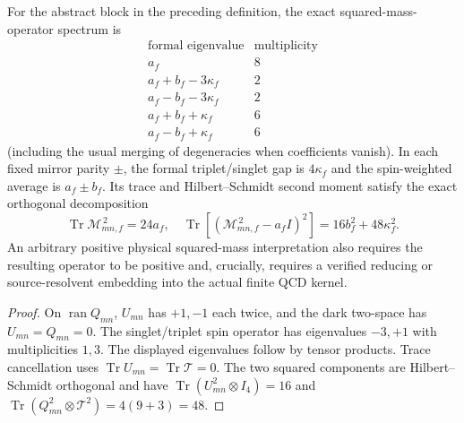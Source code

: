 \documentclass[12pt,a4paper]{article}
\begin{document}
\begin{theorem}
\label{p10:thm:v327-conditional-mirror-spin-spectrum}
For the abstract block in the preceding definition, the exact
squared-mass-operator spectrum is
\[
 \begin{array}{c|c}
 \text{formal eigenvalue}&\text{multiplicity}\\\hline
 a_f&8\\
 a_f+b_f-3\kappa_f&2\\
 a_f-b_f-3\kappa_f&2\\
 a_f+b_f+\kappa_f&6\\
 a_f-b_f+\kappa_f&6
 \end{array}
\]
(including the usual merging of degeneracies when coefficients vanish).
In each fixed mirror parity $\pm$, the formal triplet/singlet gap is
$4\kappa_f$ and the spin-weighted average is
$a_f\pm b_f$.
Its trace and Hilbert--Schmidt second moment satisfy the exact
orthogonal decomposition
\[
 \operatorname{Tr}\mathscr M_{mn,f}^{\,2}=24a_f,
 \quad \operatorname{Tr}\!\left[(\mathscr M_{mn,f}^{\,2}
 -a_fI)^2\right]=16b_f^2+48\kappa_f^2.
\]
An arbitrary positive physical squared-mass interpretation also
requires the resulting operator to be positive and, crucially,
requires a verified reducing or source-resolvent embedding into the
actual finite QCD kernel.
\end{theorem}
\begin{proof}
On $\operatorname{ran}Q_{mn}$, $U_{mn}$ has $+1,-1$ each twice,
and the dark two-space has $U_{mn}=Q_{mn}=0$.
The singlet/triplet spin operator has eigenvalues $-3,+1$ with
multiplicities $1,3$. The displayed eigenvalues follow by tensor
products. Trace cancellation uses
$\operatorname{Tr}U_{mn}=\operatorname{Tr}\mathcal T=0$.
The two squared components are Hilbert--Schmidt orthogonal and have
$\operatorname{Tr}(U_{mn}^2\otimes I_4)=16$ and
$\operatorname{Tr}(Q_{mn}^2\otimes\mathcal T^2)=4(9+3)=48$.
\end{proof}
\end{document}
